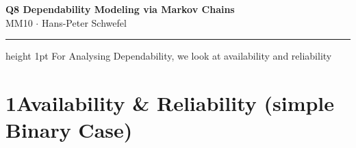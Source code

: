\documentclass[10pt,a4paper]{article}
\begin{document}

\begin{center}
  {\large\bfseries\color{headernavy} Q8 \textemdash{} Dependability Modeling via Markov Chains}\\[1pt]
  {\small MM10 $\cdot$ Hans-Peter Schwefel}
\end{center}
\vspace{1pt}\hrule height 1pt\vspace{3pt}
For Analysing Dependability, we look at availability and reliability
\section*{1\quad Availability \& Reliability (simple Binary Case)}
\end{document}

